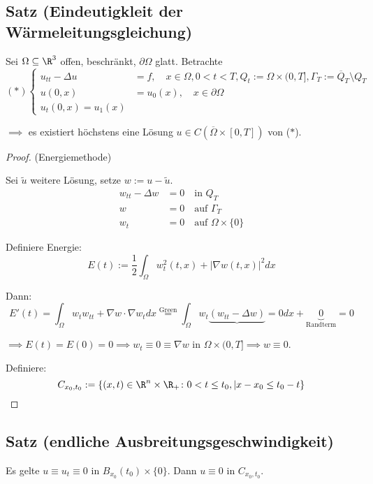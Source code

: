 \subsection{Satz (Eindeutigkleit der Wärmeleitungsgleichung)}

Sei $\Omega \subseteq \R^3$ offen, beschränkt, $\partial \Omega$ glatt. Betrachte
$$
(\ast) 
\begin{cases} 
u_{tt} - \Delta u &= f, \quad x \in \Omega, 0 < t < T, Q_t := \Omega \times (0, T], \Gamma_T :=  \overline Q_T \setminus Q_T \\
u(0,x) &= u_0(x), \quad x \in \partial \Omega \\
u_t(0,x) = u_1(x)
\end{cases}
$$

$\implies$ es existiert höchstens eine Lösung $u \in C(\overline \Omega \times [0, T])$ von ($\ast$).

\begin{proof} (Energiemethode)

Sei $\tilde u$ weitere Lösung, setze $w := u - \tilde u$.
\begin{align*}
w_{tt} - \Delta w &= 0 \quad \text{in } Q_T \\
w &= 0 \quad \text{auf } \Gamma_T \\
w_t &= 0 \quad\text{auf } \Omega \times \{0\}
\end{align*}

Definiere Energie:
$$
E(t) := \frac{1}{2} \int_\Omega w_t^2(t,x) + |\nabla w(t,x)|^2 dx
$$

Dann:
$$
E'(t) = \int_\Omega w_t w_{tt} + \nabla w \cdot \nabla w_t dx \overset{\text{Green}}{=} \int_\Omega w_t\underbrace{(w_{tt} - \Delta w)}{=0} dx + \underbrace{0}_{\text{Randterm}} = 0
$$

$\implies E(t) = E(0) = 0 \implies w_t \equiv 0 \equiv \nabla w$ in $\Omega \times (0, T] \implies w \equiv 0$. 

Definiere:
$$
C_{x_0, t_0} := \{ (x,t) \in \R^n \times \R_+  \colon 0 < t \leq  t_0, |x - x_0 \leq t_0 - t \}
$$
\end{proof}

\subsection{Satz (endliche Ausbreitungsgeschwindigkeit)}

Es gelte $u \equiv u_t \equiv 0$ in $B_{x_0}(t_0) \times \{0 \}$. Dann $u \equiv 0$ in $C_{x_0, t_0}$.

